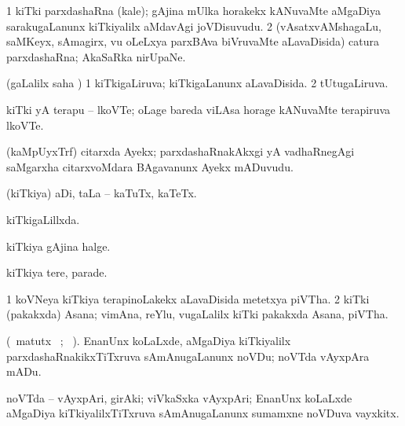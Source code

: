 {{{{{{\bentry
{}
  \gl{\nA}\bmng
\bnum
\num{1} kiTki parxdashaRna (kale); gAjina mUlka horakekx kANuvaMte aMgaDiya sarakugaLanunx kiTkiyalilx aMdavAgi joVDisuvudu. 
\num{2} (vAsatxvAMshagaLu, saMKeyx, sAmagirx, \mo vu oLeLxya parxBAva biVruvaMte aLavaDisida) catura parxdashaRna; AkaSaRka nirUpaNe. 
\enum
\emng
\eentry

\bentry
{}
  \gl{\gu}\bmng
(\saMpa gaLalilx saha \parx) 
\bnum
\num{1} kiTkigaLiruva; kiTkigaLanunx aLavaDisida. 
\num{2} tUtugaLiruva. 
\enum
\emng
\eentry

\bentry
{}
 \gl{\nA}\bmng
kiTki yA terapu -- lkoVTe; oLage bareda viLAsa horage kANuvaMte terapiruva lkoVTe. 
\emng
\eentry

\bentry
{}
  \gl{\nA}\bmng
(kaMpUyxTrf) citarxda Ayekx; parxdashaRnakAkxgi yA vadhaRnegAgi saMgarxha citarxvoMdara BAgavanunx Ayekx mADuvudu. 
\emng
\eentry

\bentry
{}
  \gl{\nA}\bmng
(kiTkiya) aDi, taLa -- kaTuTx, kaTeTx. 
\emng
\eentry

\bentry
{}
  \gl{\gu}\bmng
kiTkigaLillxda. 
\emng
\eentry

\bentry
{}
  \gl{\nA}\bmng
kiTkiya gAjina halge. 
\emng
\eentry

\bentry
{}
  \gl{\nA}\bmng
kiTkiya tere, parade. 
\emng
\eentry

\bentry
{}
  \gl{\nA}\bmng
\bnum
\num{1} koVNeya kiTkiya terapinoLakekx aLavaDisida metetxya piVTha. 
\num{2} kiTki (pakakxda) Asana; vimAna, reYlu, \mo vugaLalilx kiTki pakakxda Asana, piVTha. 
\enum
\emng
\eentry

\bentry
{}
  \gl{\nA}\bmng
{} 
\emng
\eentry

\bentry
{}
  \gl{\sakirx} (\BU\ matutx \BUkaq\ ; \vakaq\ ). \bmng
EnanUnx koLaLxde, aMgaDiya kiTkiyalilx parxdashaRnakikxTiTxruva sAmAnugaLanunx noVDu; noVTda vAyxpAra mADu. 
\emng
\eentry

\bentry
{}
  \gl{\nA}\bmng
noVTda -- vAyxpAri, girAki; viVkaSxka vAyxpAri; EnanUnx koLaLxde aMgaDiya kiTkiyalilxTiTxruva sAmAnugaLanunx sumamxne noVDuva vayxkitx. 
\emng
\eentry

}}}}}}

